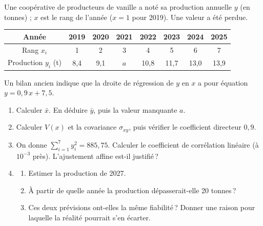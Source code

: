       \begin{exo}
            \label{exo:stat11}
            Une coop\'erative de producteurs de vanille a not\'e sa production annuelle $y$ (en tonnes) ;
            $x$ est le rang de l'ann\'ee ($x = 1$ pour 2019). Une valeur a \'et\'e perdue.
            \begin{center}
            \begin{tabular}{|c|c|c|c|c|c|c|c|}
                  \hline
                  Ann\'ee & 2019 & 2020 & 2021 & 2022 & 2023 & 2024 & 2025 \\
                  \hline
                  Rang $x_i$ & 1 & 2 & 3 & 4 & 5 & 6 & 7 \\
                  \hline
                  Production $y_i$ (t) & 8,4 & 9,1 & $a$ & 10,8 & 11,7 & 13,0 & 13,9 \\
                  \hline
            \end{tabular}
            \end{center}
            Un bilan ancien indique que la droite de r\'egression de $y$ en $x$ a pour \'equation $y = 0,9\,x + 7,5$.
            \begin{enumerate}
                  \item Calculer $\bar{x}$. En d\'eduire $\bar{y}$, puis la valeur manquante $a$.
                  \item Calculer $V(x)$ et la covariance $\sigma_{xy}$, puis v\'erifier le coefficient directeur $0,9$.
                  \item On donne $\sum_{i=1}^{7} y_i^2 = 885,75$. Calculer le coefficient de corr\'elation lin\'eaire 
                        (\`a $10^{-3}$ pr\`es). L'ajustement affine est-il justifi\'e\,?
                  \item \begin{enumerate}
                        \item Estimer la production de 2027.
                        \item \`A partir de quelle ann\'ee la production d\'epasserait-elle 20 tonnes\,?
                        \item Ces deux pr\'evisions ont-elles la m\^eme fiabilit\'e\,? Donner une raison pour laquelle 
                              la r\'ealit\'e pourrait s'en \'ecarter.
                        \end{enumerate}
            \end{enumerate}
      \end{exo}

